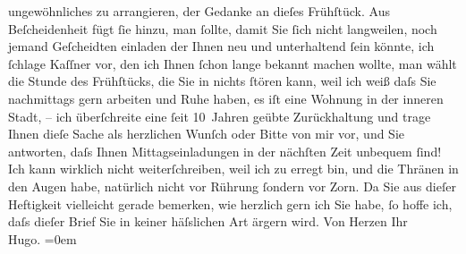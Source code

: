 \begin{ledgroupsized}[t]{13cm}
               ungewöhnliches zu arrangieren, der Gedanke an dieſes Frühſtück. Aus Beſcheidenheit
               fügt ſie hinzu, man ſollte, damit Sie ſich nicht langweilen, noch {\pb}jemand Geſcheidten einladen der
               Ihnen neu und unterhaltend ſein könnte, ich ſchlage Kaſſner vor, den ich Ihnen ſchon lange bekannt machen wollte, man wählt die
               Stunde des Frühſtücks, die Sie in nichts ſtören kann, weil {\pb}ich weiß daſs Sie nachmittags gern
               arbeiten und Ruhe haben, es iſt eine Wohnung in der inneren Stadt,\pend
           \pstart
           \numberlinefalse{}–\numberlinetrue{}\pend
           \pstart
           ich überſchreite eine ſeit 10 Jahren geübte Zurückhaltung und trage Ihnen dieſe Sache
               als herzlichen Wunſch oder Bitte von {\pb}mir vor, und Sie antworten, daſs
               Ihnen Mittagseinladungen in der nächſten Zeit unbequem ſind!\pend
           \pstart
           Ich kann wirklich nicht weiterſchreiben, weil ich zu erregt bin, und die Thränen in
               den Augen {\pb}habe, natürlich nicht
               vor Rührung ſondern vor Zorn.\pend
           \pstart
           Da Sie aus dieſer Heftigkeit vielleicht gerade bemerken, wie herzlich gern ich Sie
               habe, ſo hoffe ich, daſs dieſer Brief Sie in keiner häſslichen Art ärgern wird.\pend
           \pstart
           Von Herzen Ihr{\\[\baselineskip]}\spacefill\mbox{Hugo.}\pend
           \leftskip=0em{}\endnumbering{}\end{ledgroupsized}  \newcommand{\dateiname}{L01210}\newcommand{\titel}{Hugo von Hofmannsthal an Arthur Schnitzler, [28. 3. 1902]}\newcommand{\editorInnen}{Martin Anton Müller und Gerd-Hermann Susen}
      